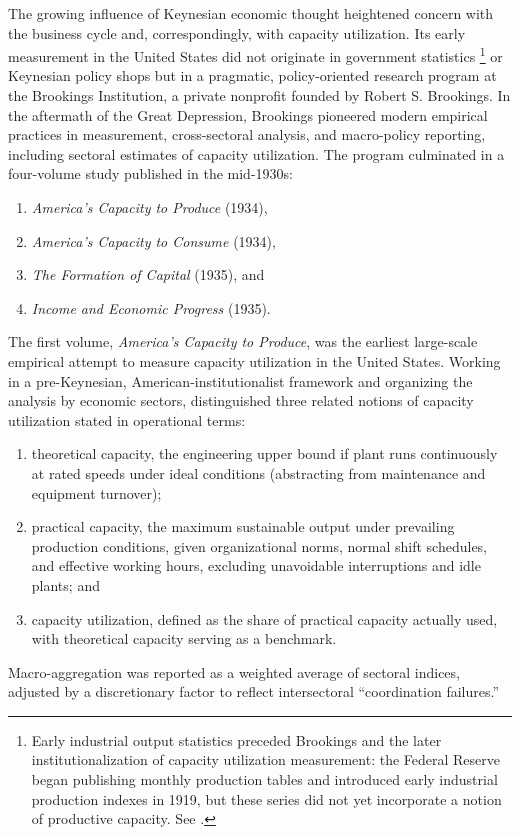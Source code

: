 \documentclass[11pt]{article}
\begin{document}
The growing influence of Keynesian economic thought heightened concern with the business cycle and, correspondingly, with capacity utilization. Its early measurement in the United States did not originate in government statistics \footnote{Early industrial output statistics preceded Brookings and the later institutionalization of capacity utilization measurement: the Federal Reserve began publishing monthly production tables and introduced early industrial production indexes in 1919, but these series did not yet incorporate a notion of productive capacity. See \citep{bogfrs2017}.} or Keynesian policy shops but in a pragmatic, policy-oriented research program at the Brookings Institution, a private nonprofit founded by Robert S. Brookings. In the aftermath of the Great Depression, Brookings pioneered modern empirical practices in measurement, cross-sectoral analysis, and macro-policy reporting, including sectoral estimates of capacity utilization. The program culminated in a four-volume study published in the mid-1930s:
\begin{enumerate}
\renewcommand{\labelenumi}{\roman{enumi})}
\item \emph{America's Capacity to Produce} (1934),
\item \emph{America's Capacity to Consume} (1934),
\item \emph{The Formation of Capital} (1935), and
\item \emph{Income and Economic Progress} (1935).
\end{enumerate}

The first volume, \emph{America's Capacity to Produce}, was the earliest large-scale empirical attempt to measure capacity utilization in the United States. Working in a pre-Keynesian, American-institutionalist framework and organizing the analysis by economic sectors, \citet{nourseetal1934} distinguished three related notions of capacity utilization stated in operational terms:

\begin{enumerate}
\renewcommand{\labelenumi}{\roman{enumi})}
\item theoretical capacity, the engineering upper bound if plant runs continuously at rated speeds under ideal conditions (abstracting from maintenance and equipment turnover);
\item practical capacity, the maximum sustainable output under prevailing production conditions, given organizational norms, normal shift schedules, and effective working hours, excluding unavoidable interruptions and idle plants; and
\item capacity utilization, defined as the share of practical capacity actually used, with theoretical capacity serving as a benchmark.
\end{enumerate}
Macro-aggregation was reported as a weighted average of sectoral indices, adjusted by a discretionary factor to reflect intersectoral ``coordination failures.''
\end{document}
